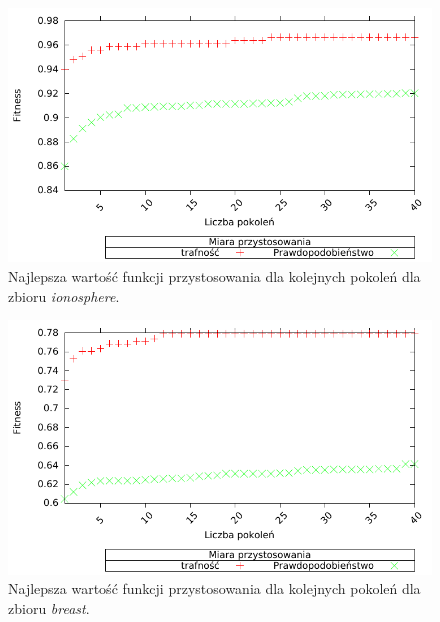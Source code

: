         \begin{figure}
                \includegraphics[scale=0.90]{figures/results/fitness/fitness-ionosphere}
                \caption{Najlepsza wartość funkcji przystosowania dla kolejnych pokoleń dla zbioru \emph{ionosphere}.\label{fig:fit-ionosphere}}
        \end{figure}    
               
        \begin{figure}
                \includegraphics[scale=0.90]{figures/results/fitness/fitness-liver-disorders}
                \caption{Najlepsza wartość funkcji przystosowania dla kolejnych pokoleń dla zbioru \emph{breast}.\label{fig:fit-liver-disorders}}
        \end{figure}    

